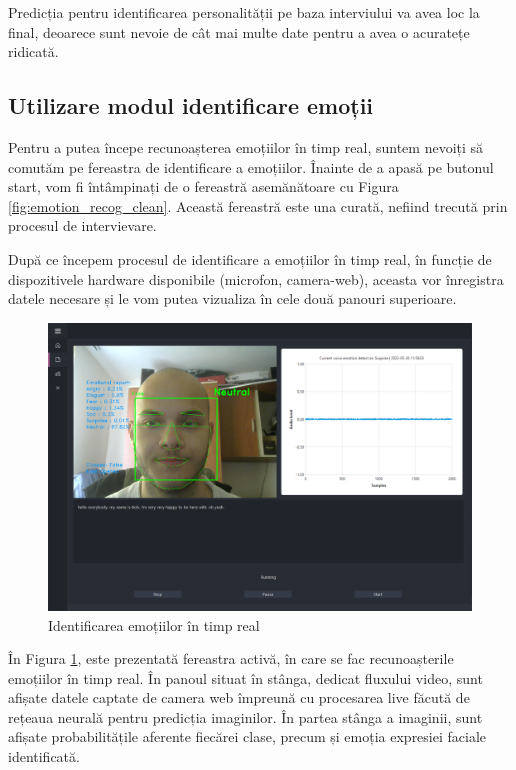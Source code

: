 \documentclass[a4paper, 12pt]{report}
\begin{document}
	Predicția pentru identificarea personalității pe baza interviului va avea loc la final, deoarece sunt nevoie de cât mai multe date pentru a avea o acuratețe ridicată.
	
	\clearpage
	\subsection{Utilizare modul identificare emoții}
	Pentru a putea începe recunoașterea emoțiilor în timp real, suntem nevoiți să comutăm pe fereastra de identificare a emoțiilor. Înainte de a apasă pe butonul start, vom fi întâmpinați de o fereastră asemănătoare cu Figura \ref{fig:emotion_recog_clean}. Această fereastră este una curată, nefiind trecută prin procesul de intervievare. 

	După ce începem procesul de identificare a emoțiilor în timp real, în funcție de dispozitivele hardware disponibile (microfon, camera-web), aceasta vor înregistra datele necesare și le vom putea vizualiza în cele două panouri superioare.
	
	\begin{figure}[H]
		\begin{center}
			\includegraphics[scale=0.35]{images/emotion_recognition.png}
		\end{center}
		\caption{Identificarea emoțiilor în timp real}
		\label{fig:emotion_recog}
	\end{figure} 

	În Figura \ref{fig:emotion_recog}, este prezentată fereastra activă, în care se fac recunoașterile emoțiilor în timp real. În panoul situat în stânga, dedicat fluxului video, sunt afișate datele captate de camera web împreună cu procesarea live făcută de rețeaua neurală pentru predicția imaginilor. În partea stânga a imaginii, sunt afișate probabilitățile aferente fiecărei clase, precum și emoția expresiei faciale identificată. 
\end{document}

